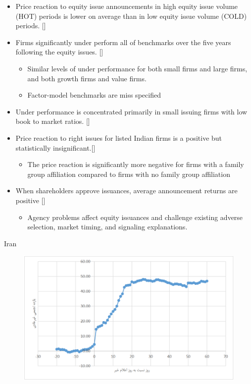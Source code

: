 \documentclass{beamer}
\begin{document}
\begin{frame}
	\scriptsize
	\begin{itemize}
		\item Price reaction to equity issue announcements in high equity issue volume (HOT) periods is lower on average than in low equity issue volume (COLD) periods. [\cite{bayless1996there}]
		
		\item Firms significantly under perform all of benchmarks
		over the five years following the equity issues. 
		[\cite{jegadeesh2000long}]
		\begin{itemize}
			\tiny
			\item Similar levels of under performance for both small firms and large firms, and both growth firms and value
			firms. 
			\item Factor-model benchmarks are miss specified
		\end{itemize}
	\item  Under performance is concentrated primarily in small issuing
	firms with low book to market ratios. [\cite{brav2000abnormal}]
	\item Price reaction to right issues for listed Indian firms is a positive but statistically insignificant.[\cite{marisetty2008price}]
	\begin{itemize}
		\tiny
		\item The price reaction is significantly more negative for firms with a family group affiliation
		compared to firms with no family group affiliation
	\end{itemize}
	\item When shareholders approve issuances, average announcement returns are positive \tiny[\cite{holderness2018equity}]
	\begin{itemize}
		\tiny
		\item  Agency problems affect equity issuances and challenge existing adverse selection, market timing, and
		signaling explanations.
	\end{itemize}
	\end{itemize}
	
\end{frame}
\normalsize
\begin{frame}{Iran}
\begin{figure}
\centering
\includegraphics[width=0.65\linewidth]{Soltani}
\label{Soltani}
\end{figure}
\end{frame}
\end{document}
